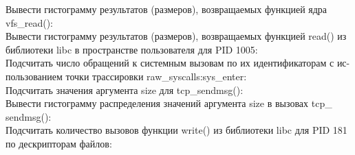 \noindent Вывести гистограмму результатов (размеров), возвращаемых функцией ядра vfs\_read(): \\
\noindent Вывести гистограмму результатов (размеров), возвращаемых функцией read() из библиотеки libc в пространстве пользователя для PID 1005: \\
\noindent Подсчитать число обращений к системным вызовам по их идентификаторам с ис- пользованием точки трассировки raw\_syscalls:sys\_enter: \\
\noindent Подсчитать значения аргумента size для tcp\_sendmsg(): \\
\noindent Вывести гистограмму распределения значений аргумента size в вызовах tcp\_ sendmsg(): \\
\noindent Подсчитать количество вызовов функции write() из библиотеки libc для PID 181 по дескрипторам файлов: \\
